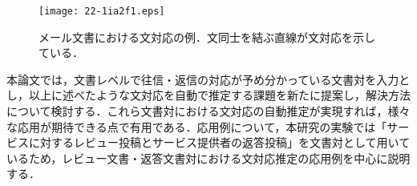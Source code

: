 \documentclass[japanese]{jnlp_1.4}
\begin{document}
\begin{figure}[t]
\begin{center}
\texttt{[image: 22-1ia2f1.eps]}
\end{center}
\caption{メール文書における文対応の例．文同士を結ぶ直線が文対応を示している．}
\label{fig:ex-dependency}
\vspace{-0.5\Cvs}
\end{figure}

本論文では，文書レベルで往信・返信の対応が予め分かっている文書対を入力とし，以上に述べたような文対応を自動で推定する課題を新たに提案し，解決方法について検討する．これら文書対における文対応の自動推定が実現すれば，様々な応用が期待できる点で有用である．応用例について，本研究の実験では「サービスに対するレビュー投稿とサービス提供者の返答投稿」を文書対として用いているため，レビュー文書・返答文書対における文対応推定の応用例を中心に説明する．
\end{document}

